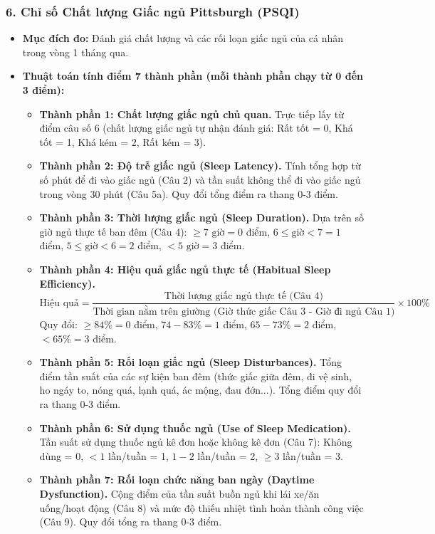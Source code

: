 \documentclass[12pt,a4paper]{article}
\begin{document}
\subsubsection*{6. Chỉ số Chất lượng Giấc ngủ Pittsburgh (PSQI)}
\begin{itemize}
    \item \textbf{Mục đích đo:} Đánh giá chất lượng và các rối loạn giấc ngủ của cá nhân trong vòng 1 tháng qua.
    \item \textbf{Thuật toán tính điểm 7 thành phần (mỗi thành phần chạy từ 0 đến 3 điểm):}
    \begin{itemize}
        \item \textbf{Thành phần 1: Chất lượng giấc ngủ chủ quan.} Trực tiếp lấy từ điểm câu số 6 (chất lượng giấc ngủ tự nhận đánh giá: Rất tốt = 0, Khá tốt = 1, Khá kém = 2, Rất kém = 3).
        \item \textbf{Thành phần 2: Độ trễ giấc ngủ (Sleep Latency).} Tính tổng hợp từ số phút để đi vào giấc ngủ (Câu 2) và tần suất không thể đi vào giấc ngủ trong vòng 30 phút (Câu 5a). Quy đổi tổng điểm ra thang 0-3 điểm.
        \item \textbf{Thành phần 3: Thời lượng giấc ngủ (Sleep Duration).} Dựa trên số giờ ngủ thực tế ban đêm (Câu 4): $\ge 7\text{ giờ} = 0$ điểm, $6 \le \text{giờ} < 7 = 1$ điểm, $5 \le \text{giờ} < 6 = 2$ điểm, $< 5\text{ giờ} = 3$ điểm.
        \item \textbf{Thành phần 4: Hiệu quả giấc ngủ thực tế (Habitual Sleep Efficiency).} 
        \begin{equation}
            \text{Hiệu quả} = \frac{\text{Thời lượng giấc ngủ thực tế (Câu 4)}}{\text{Thời gian nằm trên giường (Giờ thức giấc Câu 3 - Giờ đi ngủ Câu 1)}} \times 100\%
        \end{equation}
        Quy đổi: $\ge 84\% = 0$ điểm, $74-83\% = 1$ điểm, $65-73\% = 2$ điểm, $< 65\% = 3$ điểm.
        \item \textbf{Thành phần 5: Rối loạn giấc ngủ (Sleep Disturbances).} Tổng điểm tần suất của các sự kiện ban đêm (thức giấc giữa đêm, đi vệ sinh, ho ngáy to, nóng quá, lạnh quá, ác mộng, đau đớn...). Tổng điểm quy đổi ra thang 0-3 điểm.
        \item \textbf{Thành phần 6: Sử dụng thuốc ngủ (Use of Sleep Medication).} Tần suất sử dụng thuốc ngủ kê đơn hoặc không kê đơn (Câu 7): Không dùng = 0, $<1$ lần/tuần = 1, $1-2$ lần/tuần = 2, $\ge 3$ lần/tuần = 3.
        \item \textbf{Thành phần 7: Rối loạn chức năng ban ngày (Daytime Dysfunction).} Cộng điểm của tần suất buồn ngủ khi lái xe/ăn uống/hoạt động (Câu 8) và mức độ thiếu nhiệt tình hoàn thành công việc (Câu 9). Quy đổi tổng ra thang 0-3 điểm.

\end{itemize}
\end{itemize}
\end{document}
